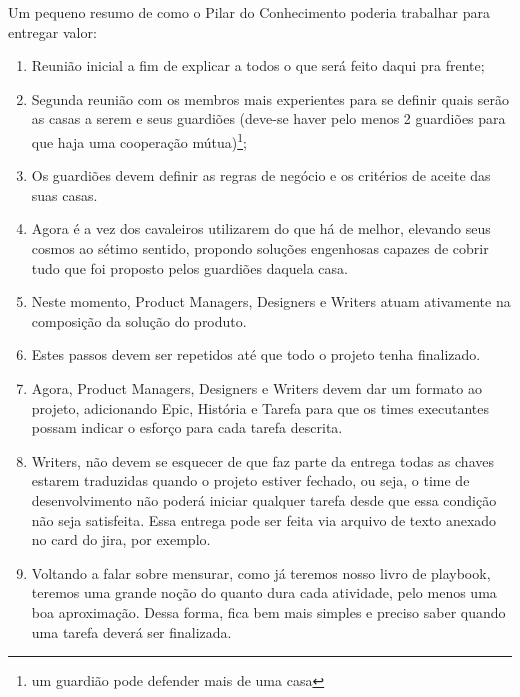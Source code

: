 Um pequeno resumo de como o Pilar do Conhecimento poderia trabalhar para entregar valor:
\begin{enumerate}
    \item Reunião inicial a fim de explicar a todos o que será feito daqui pra frente;
    \item Segunda reunião com os membros mais experientes para se definir quais serão as casas a serem e seus guardiões (deve-se haver pelo menos 2 guardiões para que haja uma cooperação mútua)\footnote{um guardião pode defender mais de uma casa};
    \item Os guardiões devem definir as regras de negócio e os critérios de aceite das suas casas.
    \item Agora é a vez dos cavaleiros utilizarem do que há de melhor, elevando seus cosmos ao sétimo sentido, propondo soluções engenhosas capazes de cobrir tudo que foi proposto pelos guardiões daquela casa. 
    \item Neste momento, Product Managers, Designers e Writers atuam ativamente na composição da solução do produto.
    \item Estes passos devem ser repetidos até que todo o projeto tenha finalizado. 
    \item Agora, Product Managers, Designers e Writers devem dar um formato ao projeto, adicionando Epic, História e Tarefa para que os times executantes possam indicar o esforço para cada tarefa descrita. 
    \item Writers, não devem se esquecer de que faz parte da entrega todas as chaves estarem traduzidas quando o projeto estiver fechado, ou seja, o time de desenvolvimento não poderá iniciar qualquer tarefa desde que essa condição não seja satisfeita. Essa entrega pode ser feita via arquivo de texto anexado no card do jira, por exemplo.
    \item Voltando a falar sobre mensurar, como já teremos nosso livro de playbook, teremos uma grande noção do quanto dura cada atividade, pelo menos uma boa aproximação. Dessa forma, fica bem mais simples e preciso saber quando uma tarefa deverá ser finalizada.
\end{enumerate}
